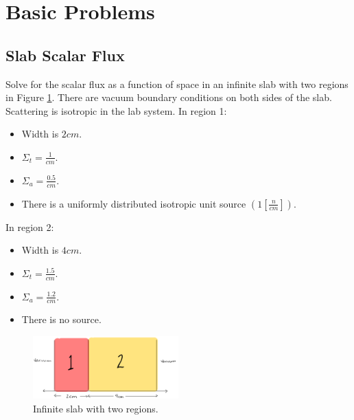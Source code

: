 \documentclass[11pt]{exam}
\begin{document}
\pagebreak

\section{Basic Problems}\label{sec:basic}
   \subsection{Slab Scalar Flux} 
   Solve for the scalar flux as a function of space in an infinite slab with 
   two regions in Figure \ref{fig:slab}.  There are vacuum boundary conditions 
   on both sides of the slab.  Scattering is isotropic in the lab system.  
        In region 1:
        \begin{itemize}
                \item Width is $2cm$.
                \item $\Sigma_t = \frac{1}{cm}$.
                \item $\Sigma_a = \frac{0.5}{cm}$.
                \item There is a uniformly distributed isotropic unit source $\left(1\left[\frac{n}{cm}\right]\right)$.
        \end{itemize}


        In region 2:
        \begin{itemize}
                \item Width is $4cm$.
                \item $\Sigma_t = \frac{1.5}{cm}$.
                \item $\Sigma_a = \frac{1.2}{cm}$.
                \item There is no source.
        \end{itemize}

        \begin{figure}[htb!]
                \begin{center}
                        \includegraphics[width=0.5\textwidth]{slab-prob.png}
                \end{center}
                \caption{Infinite slab with two regions.}
                \label{fig:slab}
        \end{figure}
\end{document}
